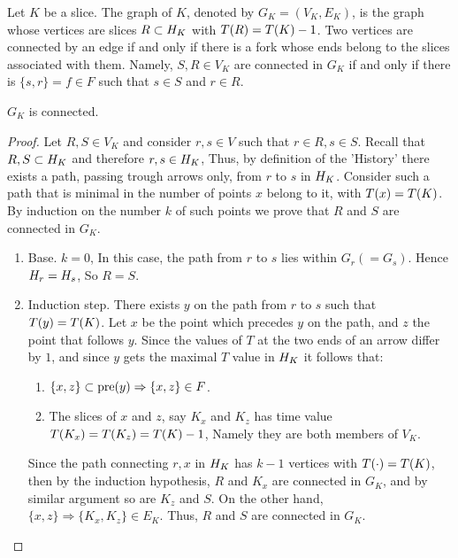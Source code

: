   \begin{definition}
    \label{def:gslice}
    Let $K$ be a slice. The graph of $K$, denoted by $G_{K} = (V_{K}, E_{K})$, is the graph whose vertices are slices $R \subset H_{K}$ with $T(R) = T(K) - 1$. Two vertices are connected by an edge if and only if there is a fork whose ends belong to the slices associated with them. Namely, $S, R \in V_{K}$ are connected in $G_{K}$ if and only if there is $\{s, r\} = f \in F$ such that $s \in S$ and $r \in R$.
  \end{definition}


  \begin{claim}
    \label{claim:connected}
    $G_{K}$ is connected. 
  \end{claim}

  \begin{proof}
    Let $R, S \in V_{K}$ and consider $r,s \in V$ such that $r \in R, s \in S$. Recall that $R,S \subset H_{K}$ and therefore $r,s \in H_{K}$, Thus, by definition of the 'History' there exists a path, passing trough arrows only, from $r$ to $s$ in $H_{K}$. Consider such a path that is minimal in the number of points $x$ belong to it, with $T(x) = T(K)$. By induction on the number $k$ of such points we prove that $R$ and $S$ are connected in $G_{K}$. 

    \begin{enumerate}
      \item Base. $k=0$, In this case, the path from $r$ to $s$ lies within $G_{r} (= G_{s})$. Hence $H_{r} = H_{s}$, So $R = S$. 
      \item Induction step. There exists $y$ on the path from $r$ to $s$ such that $T(y) = T(K)$. Let $x$ be the point which precedes $y$ on the path, and $z$ the point that follows $y$. Since the values of $T$ at the two ends of an arrow differ by $1$, and since $y$ gets the maximal $T$ value in $H_{K}$ it follows that: 
        \begin{enumerate}
          \item $\{x,z\} \subset \text{pre}(y) \Rightarrow \{x,z\} \in F$. 
          \item The slices of $x$ and $z$, say $K_{x}$ and $K_{z}$ has time value $T(K_{x}) = T(K_{z}) = T(K) -1$, Namely they are both members of $V_{K}$. 
        \end{enumerate}
        Since the path connecting $r,x$ in $H_{K}$ has $k-1$ vertices with $T(\cdot) = T(K)$, then by the induction hypothesis, $R$ and $K_{x}$ are connected in $G_{K}$, and by similar argument so are $K_{z}$ and $S$. On the other hand, $ \{x,z\} \Rightarrow \{K_{x},K_{z}\} \in E_{K}$. Thus, $R$ and $S$ are connected in $G_{K}$.
    \end{enumerate}
  \end{proof}


